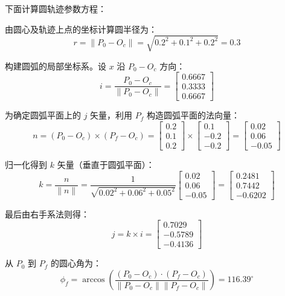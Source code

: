 \documentclass[UTF8,12pt]{ctexart}
\begin{document}
\vspace{3em}


下面计算圆轨迹参数方程：

由圆心及轨迹上点的坐标计算圆半径为：
\[
r = \|P_0 - O_c\| = \sqrt{0.2^2 + 0.1^2 + 0.2^2} = 0.3
\]

构建圆弧的局部坐标系。设 \(x\) 沿 \(P_0 - O_c\) 方向：
\[
i = \frac{P_0 - O_c}{\|P_0 - O_c\|} 
    = \begin{bmatrix}
        0.6667 \\ 0.3333 \\ 0.6667
    \end{bmatrix}
\]

为确定圆弧平面上的 \(j\) 矢量，利用 \(P_f\) 构造圆弧平面的法向量：
\[
n = (P_0 - O_c) \times (P_f - O_c) 
    = \begin{bmatrix}
        0.2 \\ 0.1 \\ 0.2
    \end{bmatrix} \times \begin{bmatrix}
        0.1 \\ -0.2 \\ -0.2
    \end{bmatrix}
    = \begin{bmatrix}
        0.02 \\ 0.06 \\ -0.05
    \end{bmatrix}
\]

归一化得到 \(k\) 矢量（垂直于圆弧平面）：
\[
k = \frac{n}{\|n\|} 
    = \frac{1}{\sqrt{0.02^2 + 0.06^2 + 0.05^2}} \begin{bmatrix}
        0.02 \\ 0.06 \\ -0.05
    \end{bmatrix}
    = \begin{bmatrix}
        0.2481 \\ 0.7442 \\ -0.6202
    \end{bmatrix}
\]

最后由右手系法则得：
\[
j = k \times i 
    = \begin{bmatrix}
        0.7029 \\ -0.5789 \\ -0.4136
    \end{bmatrix}
\]

从 \(P_0\) 到 \(P_f\) 的圆心角为：
\[
\phi_f = \arccos\left(\frac{(P_0 - O_c) \cdot (P_f - O_c)}{\|P_0 - O_c\| \|P_f - O_c\|}\right) = 116.39^\circ
\]
\end{document}
